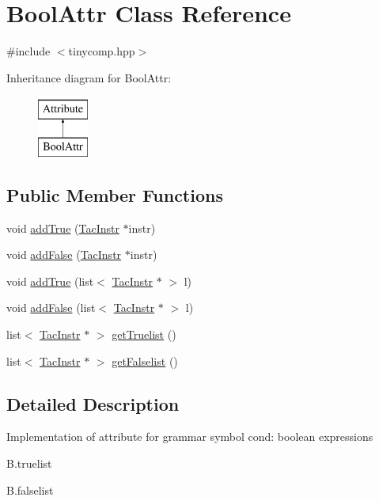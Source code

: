 \hypertarget{class_bool_attr}{}\section{Bool\+Attr Class Reference}
\label{class_bool_attr}


{\ttfamily \#include $<$tinycomp.\+hpp$>$}

Inheritance diagram for Bool\+Attr\+:\begin{figure}[H]
\begin{center}
\leavevmode
\includegraphics[height=2.000000cm]{class_bool_attr}
\end{center}
\end{figure}
\subsection*{Public Member Functions}
\begin{DoxyCompactItemize}
\item 
void \hyperlink{class_bool_attr_a9437deb583e3b6d353bc4cdc3a3ac003}{add\+True} (\hyperlink{class_tac_instr}{Tac\+Instr} $\ast$instr)
\item 
void \hyperlink{class_bool_attr_aa7a71ac5b804c231b75d060e70d30adc}{add\+False} (\hyperlink{class_tac_instr}{Tac\+Instr} $\ast$instr)
\item 
void \hyperlink{class_bool_attr_acc97b2c9d25818662e8c756d0f804523}{add\+True} (list$<$ \hyperlink{class_tac_instr}{Tac\+Instr} $\ast$ $>$ l)
\item 
void \hyperlink{class_bool_attr_afb2abc67561365b8c7bd1469fa4ff8cd}{add\+False} (list$<$ \hyperlink{class_tac_instr}{Tac\+Instr} $\ast$ $>$ l)
\item 
list$<$ \hyperlink{class_tac_instr}{Tac\+Instr} $\ast$ $>$ \hyperlink{class_bool_attr_aaba8e988b2491bda9cf9f398f53bb0c3}{get\+Truelist} ()
\item 
list$<$ \hyperlink{class_tac_instr}{Tac\+Instr} $\ast$ $>$ \hyperlink{class_bool_attr_a22d66b869b09203424020a5a3c4ceb37}{get\+Falselist} ()
\end{DoxyCompactItemize}


\subsection{Detailed Description}
Implementation of attribute for grammar symbol cond\+: boolean expressions
\begin{DoxyItemize}
\item B.\+truelist
\item B.\+falselist 
\end{DoxyItemize}

